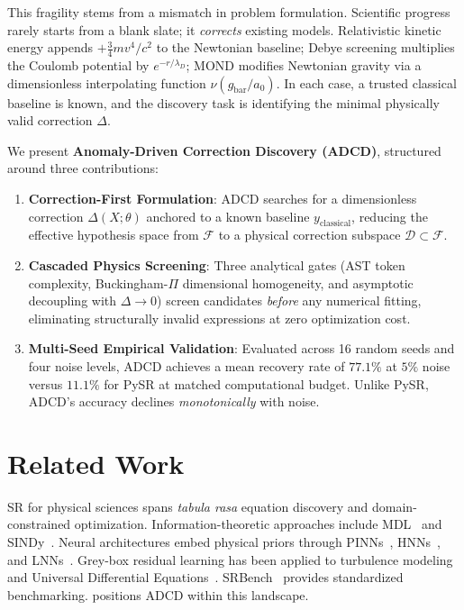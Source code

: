 \documentclass{article}
\begin{document}
This fragility stems from a mismatch in problem formulation. Scientific progress rarely starts from a blank slate; it \emph{corrects} existing models. Relativistic kinetic energy appends $+\frac{3}{4}mv^4/c^2$ to the Newtonian baseline; Debye screening multiplies the Coulomb potential by $e^{-r/\lambda_D}$; MOND modifies Newtonian gravity via a dimensionless interpolating function $\nu(g_{\text{bar}}/a_0)$. In each case, a trusted classical baseline is known, and the discovery task is identifying the minimal physically valid correction $\Delta$.

We present \textbf{Anomaly-Driven Correction Discovery (ADCD)}, structured around three contributions:
\begin{enumerate}[leftmargin=*]
    \item \textbf{Correction-First Formulation}: ADCD searches for a dimensionless correction $\Delta(X;\theta)$ anchored to a known baseline $y_{\text{classical}}$, reducing the effective hypothesis space from $\mathcal{F}$ to a physical correction subspace $\mathcal{D} \subset \mathcal{F}$.
    \item \textbf{Cascaded Physics Screening}: Three analytical gates (AST token complexity, Buckingham-$\Pi$ dimensional homogeneity, and asymptotic decoupling with $\Delta \to 0$) screen candidates \emph{before} any numerical fitting, eliminating structurally invalid expressions at zero optimization cost.
    \item \textbf{Multi-Seed Empirical Validation}: Evaluated across 16 random seeds and four noise levels, ADCD achieves a mean recovery rate of $77.1\%$ at $5\%$ noise versus $11.1\%$ for PySR at matched computational budget. Unlike PySR, ADCD's accuracy declines \emph{monotonically} with noise.
\end{enumerate}

\section{Related Work}
\label{sec:related}

SR for physical sciences spans \emph{tabula rasa} equation discovery and domain-constrained optimization. Information-theoretic approaches include MDL~\cite{rissanen1978mdl} and SINDy~\cite{brunton2016sindy}. Neural architectures embed physical priors through PINNs~\cite{raissi2019physics}, HNNs~\cite{greydanus2019hamiltonian}, and LNNs~\cite{cranmer2020lagrangian}. Grey-box residual learning has been applied to turbulence modeling~\cite{weatheritt2016turbulence} and Universal Differential Equations~\cite{rackauckas2020universal}. SRBench~\cite{lacava2021srbench} provides standardized benchmarking.  positions ADCD within this landscape.
\end{document}
